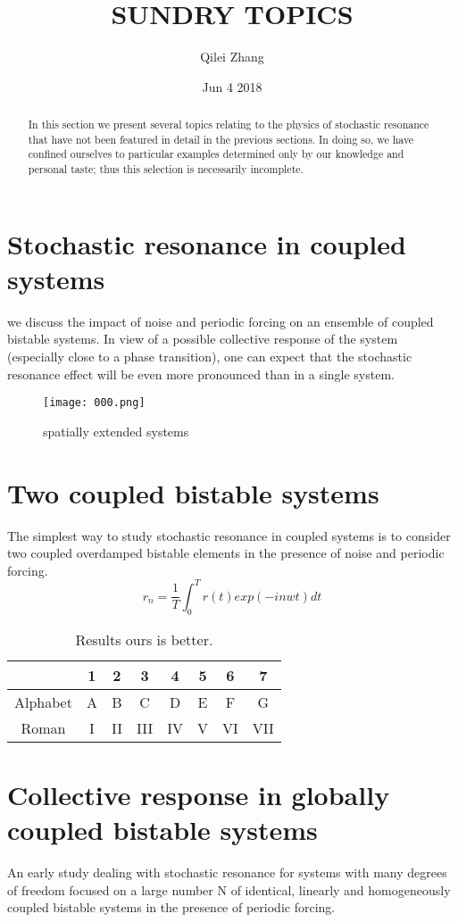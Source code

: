 \documentclass[30pt,twocolumn,letterpaper]{article}
\author{Qilei Zhang}
\date{Jun 4 2018}
\title{SUNDRY TOPICS}
\begin{document}
\maketitle
\begin{abstract}
   In this section we present several topics relating to the physics of stochastic resonance that have not been featured in detail in the previous sections. In doing so, we have confined ourselves to particular examples determined only by our knowledge and personal taste; thus this selection is necessarily incomplete.
\end{abstract}
\section{Stochastic resonance in coupled systems}
we discuss the impact of noise and periodic forcing on an ensemble of coupled bistable systems. In view of a possible collective response of the system (especially close to a phase transition), one can expect that the stochastic resonance effect will be even more pronounced than in a single system\cite{Carroll1993Stochastic}.
\begin{figure}[htbp]
\small
\centering
\texttt{[image: 000.png]}
\caption{spatially extended systems}
\label{fig:lable}
\end{figure}
\section{Two coupled bistable systems}
The simplest way to study stochastic resonance in coupled systems is to consider two coupled overdamped bistable elements in the presence of noise and periodic forcing\cite{Collins1995Stochastic}. \\
\begin{equation}
r_n=\frac{1}{T}\int_0^T r(t)exp(-inwt)dt
\end{equation}
\begin{table}
\begin{center}
\begin{tabular}{cccccccc}
\toprule
         & 1 &  2  &   3  &  4  &  5  &  6  & 7 \\
\midrule
Alphabet & A &  B  &   C  &  D  &  E  &  F  & G\\
Roman    & I &  II &  III &  IV &  V  &  VI & VII\\
\bottomrule
\end{tabular}
\end{center}
\caption{Results ours is better.}
\end{table}
\section{Collective response in globally coupled bistable systems}
An early study dealing with stochastic resonance for systems with many degrees of freedom focused on a large number N of identical, linearly and homogeneously coupled bistable systems in the presence of periodic forcing\cite{Rallabandi2010Magnetic}.
{\small


}
\end{document}
